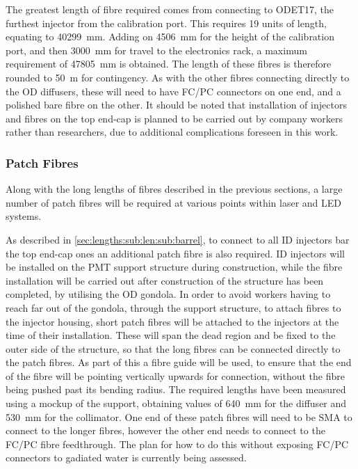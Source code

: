 \documentclass[a4paper,11pt]{article}
\begin{document}
The greatest length of fibre required comes from connecting to ODET17, the furthest injector from the calibration port. This requires 19 units of length, equating to 40299~mm. Adding on 4506~mm for the height of the calibration port, and then 3000~mm for travel to the electronics rack, a maximum requirement of 47805~mm is obtained. The length of these fibres is therefore rounded to 50~m for contingency. As with the other fibres connecting directly to the OD diffusers, these will need to have FC/PC connectors on one end, and a polished bare fibre on the other. It should be noted that installation of injectors and fibres on the top end-cap is planned to be carried out by company workers rather than researchers, due to additional complications foreseen in this work.


\subsubsection{Patch Fibres}\label{sec:lengths:sub:len:sub:patch}

Along with the long lengths of fibres described in the previous sections, a large number of patch fibres will be required at various points within laser and LED systems.

As described in \cref{sec:lengths:sub:len:sub:barrel}, to connect to all ID injectors bar the top end-cap ones an additional patch fibre is also required. ID injectors will be installed on the PMT support structure during construction, while the fibre installation will be carried out after construction of the structure has been completed, by utilising the OD gondola. In order to avoid workers having to reach far out of the gondola, through the support structure, to attach fibres to the injector housing, short patch fibres will be attached to the injectors at the time of their installation. These will span the dead region and be fixed to the outer side of the structure, so that the long fibres can be connected directly to the patch fibres. As part of this a fibre guide will be used, to ensure that the end of the fibre will be pointing vertically upwards for connection, without the fibre being pushed past its bending radius. The required lengths have been measured using a mockup of the support, obtaining values of 640~mm for the diffuser and 530~mm for the collimator. One end of these patch fibres will need to be SMA to connect to the longer fibres, however the other end needs to connect to the FC/PC fibre feedthrough. The plan for how to do this without exposing FC/PC connectors to gadiated water is currently being assessed.
\end{document}
